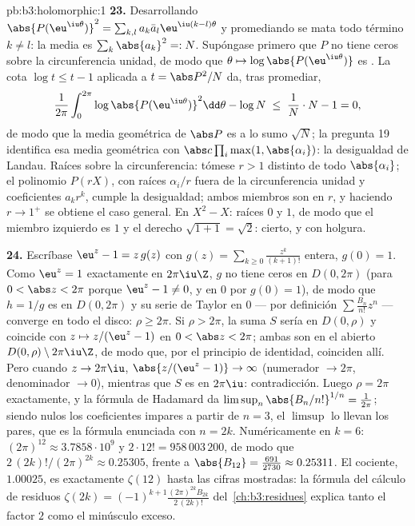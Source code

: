 \begin{solution}{pb:b3:holomorphic:1}
\textbf{23.} Desarrollando
$\abs{P(\eu^{\iu\theta})}^2 = \sum_{k,l}a_k\bar a_l
\eu^{\iu(k-l)\theta}$ y promediando se mata todo término $k \neq
l$: la media es $\sum_k\abs{a_k}^2 =: N$. Supóngase primero que $P$ no
tiene ceros sobre la circunferencia unidad, de modo que $\theta \mapsto
\log\abs{P(\eu^{\iu\theta})}$ es
. La cota $\log
t \leq t - 1$ aplicada a $t = \abs P^2/N$ da, tras promediar,
\[
\frac1{2\pi}\int_0^{2\pi}\log\abs{P(\eu^{\iu\theta})}^2
\dd\theta - \log N
\;\leq\; \frac1N\cdot N - 1 = 0,
\]
de modo que la media geométrica de $\abs P$ es a lo sumo $\sqrt N$; la
pregunta 19 identifica esa media geométrica con
$\abs c\prod_i\max(1, \abs{\alpha_i})$: la desigualdad de Landau. Raíces
sobre la circunferencia: tómese $r > 1$ distinto de todo
$\abs{\alpha_i}$; el polinomio $P(rX)$, con raíces $\alpha_i/r$ fuera de
la circunferencia unidad y coeficientes $a_kr^k$, cumple la desigualdad;
ambos miembros son  en
$r$, y haciendo $r \to 1^+$ se obtiene el caso general. En $X^2 -
X$: raíces $0$ y $1$, de modo que el miembro izquierdo es $1$ y el
derecho $\sqrt{1 + 1} = \sqrt2$: cierto, y con holgura.

\textbf{24.} Escríbase $\eu^z - 1 = z\,g(z)$ con $g(z) =
\sum_{k\geq0}\frac{z^k}{(k+1)!}$ entera, $g(0) = 1$. Como $\eu^z = 1$
exactamente en $2\pi\iu\Z$, $g$ no tiene ceros en $D(0, 2\pi)$ (para
$0 < \abs z < 2\pi$ porque $\eu^z - 1
\neq 0$, y en $0$ por $g(0) = 1$), de modo que $h = 1/g$ es
 en $D(0,2\pi)$ y su serie de
Taylor en $0$ --- por definición $\sum\frac{B_n}{n!}z^n$ --- converge en
todo el disco: $\rho \geq 2\pi$. Si $\rho > 2\pi$, la suma $S$ sería
 en $D(0,\rho)$ y coincide
con $z
\mapsto z/(\eu^z - 1)$ en $0 < \abs z < 2\pi$; ambas son
 en el
abierto
 $D(0,\rho) \setminus
2\pi\iu\Z$, de modo que, por el principio de identidad, coinciden allí.
Pero cuando $z \to 2\pi\iu$, $\abs{z/(\eu^z - 1)} \to \infty$ (numerador
$\to 2\pi$, denominador $\to 0$), mientras que $S$ es
 en $2\pi\iu$:
contradicción. Luego $\rho = 2\pi$ exactamente, y la fórmula de Hadamard
da $\limsup_n\abs{B_n/n!}^{1/n} = \frac1{2\pi}$; siendo nulos los
coeficientes impares a partir de $n = 3$, el $\limsup$ lo llevan los
 pares, que es la fórmula enunciada con $n = 2k$. Numéricamente
en $k = 6$: $(2\pi)^{12} \approx
3.7858\cdot10^9$ y $2\cdot12! = 958\,003\,200$, de modo que
$2\,(2k)!/(2\pi)^{2k} \approx 0.25305$, frente a
$\abs{B_{12}} = \frac{691}{2730} \approx 0.25311$. El cociente,
$1.00025$, es exactamente $\zeta(12)$ hasta las cifras mostradas: la
fórmula del cálculo de residuos $\zeta(2k) =
(-1)^{k+1}\frac{(2\pi)^{2k}B_{2k}}{2\,(2k)!}$ del~\cref{ch:b3:residues}
explica tanto el factor $2$ como el minúsculo exceso.


\end{solution}
